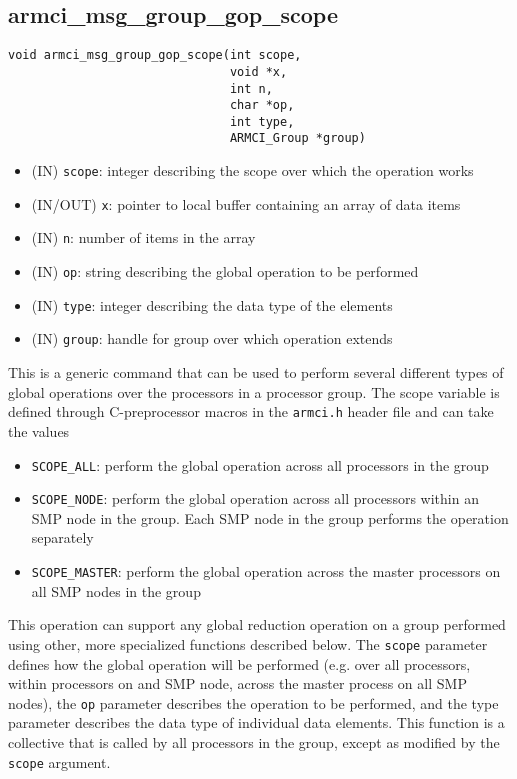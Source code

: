 \documentclass[12pt]{article}
\begin{document}
\subsection{armci\_msg\_group\_gop\_scope}
\begin{verbatim}
void armci_msg_group_gop_scope(int scope,
                               void *x,
                               int n,
                               char *op,
                               int type,
                               ARMCI_Group *group)
\end{verbatim}
\begin{itemize}
\item (IN) \texttt{scope}: integer describing the scope over which the operation
works
\item (IN/OUT) \texttt{x}: pointer to local buffer containing an array of data items
\item (IN) \texttt{n}: number of items in the array
\item (IN) \texttt{op}: string describing the global operation to be performed
\item (IN) \texttt{type}: integer describing the data type of the elements
\item (IN) \texttt{group}: handle for group over which operation extends
\end{itemize}
This is a generic command that can be used to perform several different types of
global operations over the processors in a processor group. The scope variable is
defined through C-preprocessor macros in the \texttt{armci.h} header file and can take
the values
\begin{itemize}
\item \texttt{SCOPE\_ALL}: perform the global operation across all processors in
the group
\item \texttt{SCOPE\_NODE}: perform the global operation across all processors
within an SMP node in the group. Each SMP node in the group performs the
operation separately
\item \texttt{SCOPE\_MASTER}: perform the global operation across the master
processors on all SMP nodes in the group
\end{itemize}
This operation can support any global reduction operation on a
group performed using other, more specialized functions described below. The
\texttt{scope} parameter defines how the global operation will be performed (e.g.
over all processors, within processors on and SMP node, across the master process
on all SMP nodes), the \texttt{op} parameter describes the operation to be
performed, and the type parameter describes the data type of individual data
elements. This function is a collective that is called by all processors in the
group, except as modified by the \texttt{scope} argument. 
\end{document}
